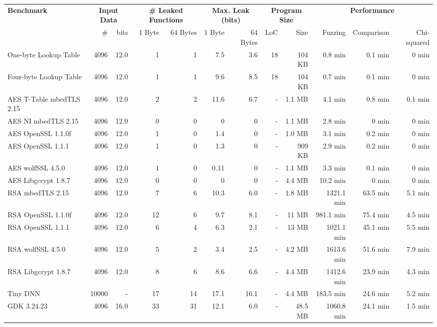 \begin{table}
{\begin{tabular}{lrrrrrrrrrrr}
\textbf{Benchmark}   & \multicolumn{2}{c}{\textbf{Input Data}} &  \multicolumn{2}{c}{\textbf{\# Leaked Functions}} & \multicolumn{2}{c}{\textbf{Max. Leak (bits)}}   & \multicolumn{2}{c}{\textbf{Program Size}}    & \multicolumn{3}{c}{\textbf{Performance}}    \\ 
\cmidrule(lr){2-3}\cmidrule(lr){4-5}\cmidrule(lr){6-7}\cmidrule(lr){8-9}\cmidrule(lr){10-12}& \# & bits &  1 Byte &  64 Bytes & 1 Byte  & 64 Bytes & LoC & Size & Fuzzing & Comparison & Chi-squared
\\\midrule
One-byte Lookup Table & 4096 & 12.0& 1&1&7.5& 3.6 & 18 & 104 KB & 0.8 min & 0.1 min & 0 min\\
Four-byte Lookup Table & 4096 & 12.0& 1&1&9.6& 8.5 & 18 & 104 KB & 0.7 min & 0.1 min & 0 min\\
AES T-Table mbedTLS 2.15 & 4096 & 12.0&2&2&11.6 &6.7& -& 1.1 MB &4.1 min & 0.8 min & 0.1 min  \\
AES NI mbedTLS 2.15 & 4096 & 12.0&0&0&0 &0&-& 1.1 MB & 2.8 min & 0 min & 0 min  \\
AES OpenSSL 1.1.0f  & 4096 & 12.0 & 1&0 &1.4 & 0&-& 1.0 MB  & 3.1 min & 0.2 min & 0 min \\
AES  OpenSSL 1.1.1& 4096 & 12.0 & 1&0 &1.3&0&-& 909 KB & 2.9 min & 0.2 min & 0 min\\
AES  wolfSSL 4.5.0& 4096 & 12.0 &1&0& 0.11& 0 & - &1.1 MB & 3.3 min & 0.1 min & 0 min \\
AES Libgcrypt 1.8.7& 4096 & 12.0 &0 &0 &0&0 &-&4.4 MB & 10.2 min& 0 min & 0 min\\
RSA mbedTLS 2.15& 4096 & 12.0 &7&6&10.3& 6.0 &-&1.8 MB& 1321.1 min & 63.5 min & 5.1 min \\
RSA OpenSSL 1.1.0f& 4096 & 12.0 &12&6&9.7& 8.1 &-& 11 MB & 981.1 min & 75.4 min & 4.5 min\\
RSA OpenSSL 1.1.1& 4096 & 12.0 &6&4&6.3& 2.1&-&13 MB & 1021.1 min & 45.1 min & 5.5 min\\
RSA wolfSSL 4.5.0& 4096 & 12.0 &5&2&3.4& 2.5&-&4.2 MB & 1613.6 min & 51.6 min & 7.9 min\\
RSA Libgcrypt 1.8.7& 4096 & 12.0 &8&6&8.6& 6.6&-&4.4 MB & 1412.6 min & 23.9 min & 4.3 min\\
Tiny DNN & 10000 & - & 17&14&17.1&16.1&-& 4.4 MB & 183.5 min & 24.6 min & 5.2 min\\
GDK 3.24.23 & 4096 & 16.0 & 33&31& 12.1& 6.0&-& 48.5 MB & 1060.8 min & 24.1 min & 1.5 min\\
\bottomrule
\end{tabular}
}

\end{table}

